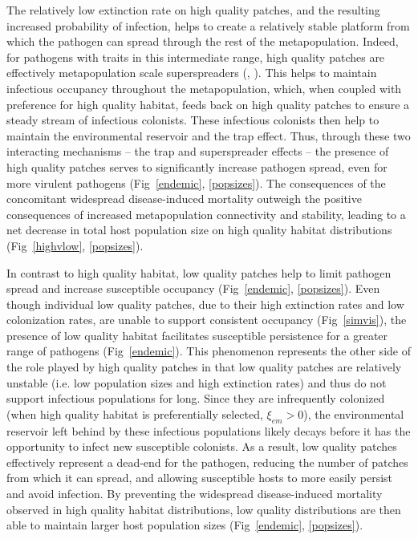 \documentclass{article}
\begin{document}
The relatively low extinction rate on high quality patches, and the resulting increased probability of infection, helps to create a relatively stable platform from which the pathogen can spread through the rest of the metapopulation.
Indeed, for pathogens with traits in this intermediate range, high quality patches are effectively metapopulation scale superspreaders (\cite{Lloyd-Smith2005}, \cite{Paull2012}).  
This helps to maintain infectious occupancy throughout the metapopulation, which, when coupled with preference for high quality habitat, feeds back on high quality patches to ensure a steady stream of infectious colonists.
These infectious colonists then help to maintain the environmental reservoir and the trap effect.  
Thus, through these two interacting mechanisms -- the trap and superspreader effects -- the presence of high quality patches serves to significantly increase pathogen spread, even for more virulent pathogens (Fig~\ref{endemic}, \ref{popsizes}).
The consequences of the concomitant widespread disease-induced mortality outweigh the positive consequences of increased metapopulation connectivity and stability, leading to a net decrease in total host population size on high quality habitat distributions (Fig~\ref{highvlow}, \ref{popsizes}).  

In contrast to high quality habitat, low quality patches help to limit pathogen spread and increase susceptible occupancy (Fig~\ref{endemic}, \ref{popsizes}). 
Even though individual low quality patches, due to their high extinction rates and low colonization rates, are unable to support consistent occupancy (Fig~\ref{simvis}), the presence of low quality habitat facilitates susceptible persistence for a greater range of pathogens (Fig~\ref{endemic}).  
This phenomenon represents the other side of the role played by high quality patches in that low quality patches are relatively unstable (i.e. low population sizes and high extinction rates) and thus do not support infectious populations for long.
Since they are infrequently colonized (when high quality habitat is preferentially selected, $\xi_{em} > 0$), the environmental reservoir left behind by these infectious populations likely decays before it has the opportunity to infect new susceptible colonists.  
As a result, low quality patches effectively represent a dead-end for the pathogen, reducing the number of patches from which it can spread, and allowing susceptible hosts to more easily persist and avoid infection.
By preventing the widespread disease-induced mortality observed in high quality habitat distributions, low quality distributions are then able to maintain larger host population sizes (Fig~\ref{endemic}, \ref{popsizes}).
\end{document}
